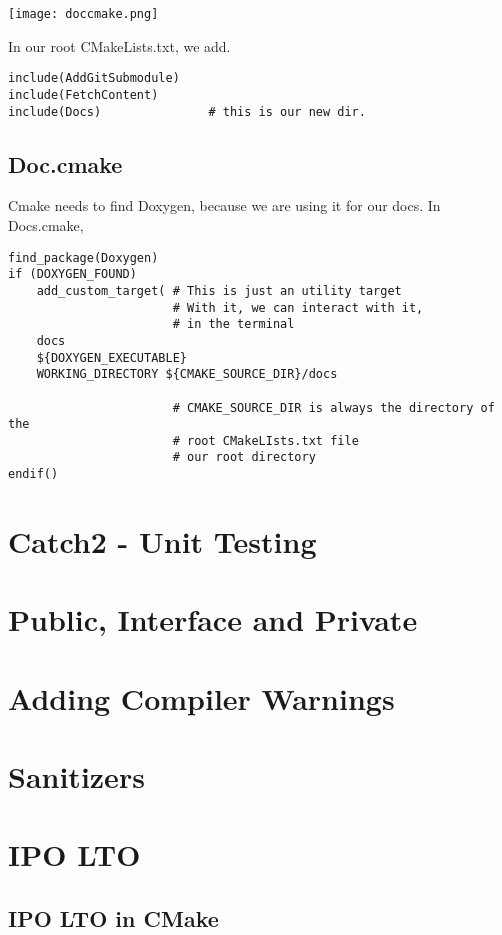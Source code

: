 \begin{center}
    \texttt{[image: doccmake.png]}
\end{center}

In our root CMakeLists.txt, we add.

\begin{verbatim}
include(AddGitSubmodule)
include(FetchContent)
include(Docs)               # this is our new dir.

\end{verbatim}


\subsection{Doc.cmake}

Cmake needs to find Doxygen, because we are using it for our docs. In Docs.cmake,

\begin{verbatim}
find_package(Doxygen)
if (DOXYGEN_FOUND)
    add_custom_target( # This is just an utility target
                       # With it, we can interact with it, 
                       # in the terminal
    docs
    ${DOXYGEN_EXECUTABLE}
    WORKING_DIRECTORY ${CMAKE_SOURCE_DIR}/docs

                       # CMAKE_SOURCE_DIR is always the directory of the
                       # root CMakeLIsts.txt file
                       # our root directory
endif()
\end{verbatim}






\section{Catch2 - Unit Testing}


\section{Public, Interface and Private}


\section{Adding Compiler Warnings}


\section{Sanitizers}


\section{IPO LTO}


\subsection{IPO LTO in CMake}


















